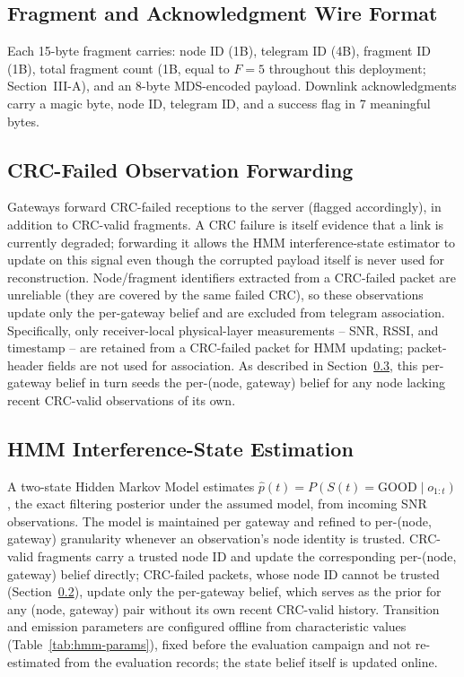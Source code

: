 \documentclass[journal]{IEEEtran}
\begin{document}
\subsection{Fragment and Acknowledgment Wire Format}
Each 15-byte fragment carries: node ID (1B), telegram ID (4B), fragment ID (1B), total fragment count (1B, equal to $F=5$ throughout this deployment; Section~III-A), and an 8-byte MDS-encoded payload. Downlink acknowledgments carry a magic byte, node ID, telegram ID, and a success flag in 7 meaningful bytes.

\subsection{CRC-Failed Observation Forwarding}
\label{sec:crc-fail}
Gateways forward CRC-failed receptions to the server (flagged accordingly), in addition to CRC-valid fragments. A CRC failure is itself evidence that a link is currently degraded; forwarding it allows the HMM interference-state estimator to update on this signal even though the corrupted payload itself is never used for reconstruction. Node/fragment identifiers extracted from a CRC-failed packet are unreliable (they are covered by the same failed CRC), so these observations update only the per-gateway belief and are excluded from telegram association. Specifically, only receiver-local physical-layer measurements -- SNR, RSSI, and timestamp -- are retained from a CRC-failed packet for HMM updating; packet-header fields are not used for association. As described in Section~\ref{sec:hmm}, this per-gateway belief in turn seeds the per-(node, gateway) belief for any node lacking recent CRC-valid observations of its own.

\subsection{HMM Interference-State Estimation}
\label{sec:hmm}
A two-state Hidden Markov Model estimates $\hat{p}(t) = P(S(t) = \text{GOOD} \mid o_{1:t})$, the exact filtering posterior under the assumed model, from incoming SNR observations. The model is maintained per gateway and refined to per-(node, gateway) granularity whenever an observation's node identity is trusted. CRC-valid fragments carry a trusted node ID and update the corresponding per-(node, gateway) belief directly; CRC-failed packets, whose node ID cannot be trusted (Section~\ref{sec:crc-fail}), update only the per-gateway belief, which serves as the prior for any (node, gateway) pair without its own recent CRC-valid history. Transition and emission parameters are configured offline from characteristic values (Table~\ref{tab:hmm-params}), fixed before the evaluation campaign and not re-estimated from the evaluation records; the state belief itself is updated online.
\end{document}
